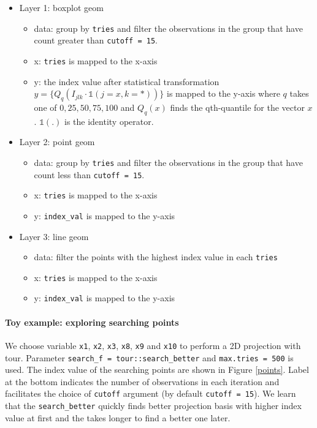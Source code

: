 \documentclass[12pt]{article}
\providecommand{\tightlist}{%
  \setlength{\itemsep}{0pt}\setlength{\parskip}{0pt}}
\begin{document}
\begin{itemize}
\tightlist
\item
  Layer 1: boxplot geom

  \begin{itemize}
  \tightlist
  \item
    data: group by \texttt{tries} and filter the observations in the
    group that have count greater than \texttt{cutoff\ =\ 15}.
  \item
    x: \texttt{tries} is mapped to the x-axis
  \item
    y: the index value after statistical transformation
    \(y = \{Q_q(I_{jlk} \cdot \mathds{1} (j = x, k = \ast))\}\) is
    mapped to the y-axis where \(q\) takes one of \(0, 25, 50, 75, 100\)
    and \(Q_q(x)\) finds the qth-quantile for the vector \(x\).
    \(\mathds{1}(.)\) is the identity operator.
  \end{itemize}
\item
  Layer 2: point geom

  \begin{itemize}
  \tightlist
  \item
    data: group by \texttt{tries} and filter the observations in the
    group that have count less than \texttt{cutoff\ =\ 15}.
  \item
    x: \texttt{tries} is mapped to the x-axis
  \item
    y: \texttt{index\_val} is mapped to the y-axis
  \end{itemize}
\item
  Layer 3: line geom

  \begin{itemize}
  \tightlist
  \item
    data: filter the points with the highest index value in each
    \texttt{tries}
  \item
    x: \texttt{tries} is mapped to the x-axis
  \item
    y: \texttt{index\_val} is mapped to the y-axis
  \end{itemize}
\end{itemize}

\hypertarget{toy-example-exploring-searching-points}{%
\paragraph{Toy example: exploring searching
points}\label{toy-example-exploring-searching-points}}

We choose variable \texttt{x1}, \texttt{x2}, \texttt{x3}, \texttt{x8},
\texttt{x9} and \texttt{x10} to perform a 2D projection with tour.
Parameter \texttt{search\_f\ =\ tour::search\_better} and
\texttt{max.tries\ =\ 500} is used. The index value of the searching
points are shown in Figure \ref{points}. Label at the bottom indicates
the number of observations in each iteration and facilitates the choice
of \texttt{cutoff} argument (by default \texttt{cutoff\ =\ 15}). We
learn that the \texttt{search\_better} quickly finds better projection
basis with higher index value at first and the takes longer to find a
better one later.
\end{document}
